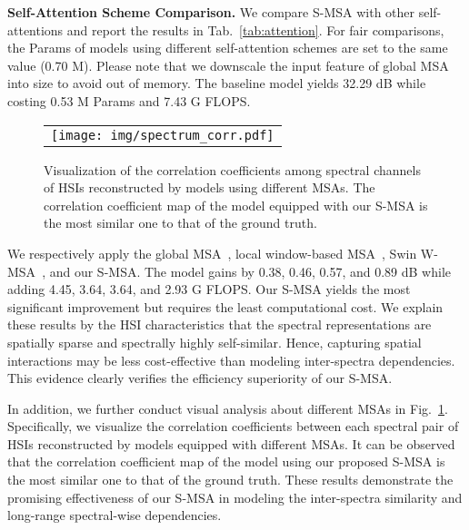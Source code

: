\documentclass[10pt,twocolumn,letterpaper]{article}
\begin{document}
\noindent\textbf{Self-Attention Scheme Comparison.} We compare S-MSA with other self-attentions and report the  results in Tab.~\ref{tab:attention}. For fair comparisons, the Params of models using different self-attention schemes are set to the same value (0.70 M). Please note that we downscale the input feature of global MSA~\cite{global_msa} into  size to avoid out of memory. The baseline model yields 32.29 dB while costing 0.53 M Params and 7.43 G FLOPS. 
\begin{figure}[h]
	\begin{center}
		\begin{tabular}[t]{c} \hspace{-2.5mm} 
			\texttt{[image: img/spectrum\_corr.pdf]}
		\end{tabular}
	\end{center}
	\vspace{-8mm}
	\caption{\small  Visualization of the correlation coefficients among spectral channels of HSIs reconstructed by models using different MSAs. The correlation coefficient map of the model equipped with our S-MSA is the most similar one to that of the ground truth. }
	\label{fig:sa_compare}
	\vspace{-5mm}
\end{figure}
We respectively apply the global MSA~\cite{global_msa}, local window-based MSA~\cite{liu2021swin}, Swin W-MSA~\cite{liu2021swin}, and our S-MSA. The model gains by 0.38, 0.46, 0.57, and 0.89 dB while adding 4.45, 3.64, 3.64, and 2.93 G FLOPS. Our S-MSA yields the most significant improvement but requires the least computational cost. We explain these results by the HSI characteristics  that the spectral representations are spatially sparse and spectrally highly self-similar. Hence, capturing spatial interactions may be less cost-effective than modeling inter-spectra dependencies. This evidence clearly verifies the efficiency superiority of our S-MSA. 

In addition, we further conduct visual analysis about different MSAs in Fig.~\ref{fig:sa_compare}. Specifically, we visualize the correlation coefficients between each spectral pair of HSIs reconstructed by models equipped with different MSAs. It can be observed that the correlation coefficient map of the model using our proposed S-MSA is the most similar one to that of the ground truth. These results demonstrate the promising effectiveness of our S-MSA in modeling the inter-spectra similarity and  long-range spectral-wise dependencies.    
\end{document}
